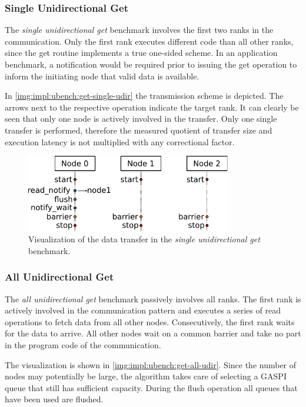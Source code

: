 \subsubsection*{Single Unidirectional Get}

The \emph{single unidirectional get} benchmark involves the first two ranks in the communication. Only the first rank executes different code than all other ranks, since the get routine implements a true one-sided scheme. In an application benchmark, a notification would be required prior to issuing the get operation to inform the initiating node that valid data is available.

In \autoref{img:impl:ubench:get-single-udir} the transmission scheme is depicted. The arrows next to the respective operation indicate the target rank. It can clearly be seen that only one node is actively involved in the transfer. Only one single transfer is performed, therefore the measured quotient of transfer size and execution latency is not multiplied with any correctional factor.

\begin{figure}[htb]
\centering
\includegraphics[width=0.8\textwidth]{img/bench-get-single-udir}
\caption{Visualization of the data transfer in the \emph{single unidirectional get} benchmark.}
\label{img:impl:ubench:get-single-udir}
\end{figure}

\subsubsection*{All Unidirectional Get}

The \emph{all unidirectional get} benchmark passively involves all ranks. The first rank is actively involved in the communication pattern and executes a series of read operations to fetch data from all other nodes. Consecutively, the first rank waits for the data to arrive. All other nodes wait on a common barrier and take no part in the program code of the communication.

The visualization is shown in \autoref{img:impl:ubench:get-all-udir}. Since the number of nodes may potentially be large, the algorithm takes care of selecting a \ac{GASPI} queue that still has sufficient capacity. During the flush operation all queues that have been used are flushed.

